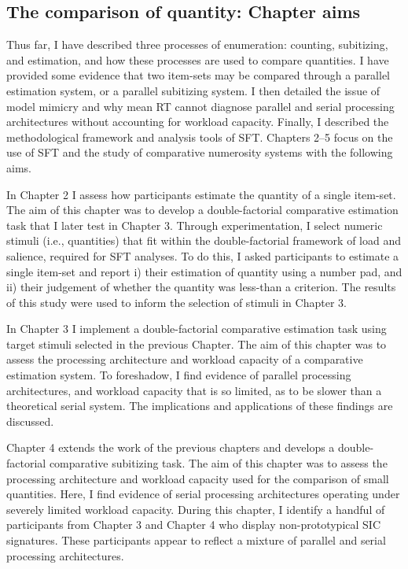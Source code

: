 \subsection{The comparison of quantity: Chapter aims}
Thus far, I have described three processes of enumeration: counting, subitizing, and estimation, and how these processes are used to compare quantities. I have provided some evidence that two item-sets may be compared through a parallel estimation system, or a parallel subitizing system. I then detailed the issue of model mimicry and why mean RT cannot diagnose parallel and serial processing architectures without accounting for workload capacity. Finally, I described the methodological framework and analysis tools of SFT. Chapters 2--5 focus on the use of SFT and the study of comparative numerosity systems with the following aims.

In Chapter 2 I assess how participants estimate the quantity of a single item-set. The aim of this chapter was to develop a double-factorial comparative estimation task that I later test in Chapter 3. Through experimentation, I select numeric stimuli (i.e., quantities) that fit within the double-factorial framework of load and salience, required for SFT analyses. To do this, I asked participants to estimate a single item-set and report i) their estimation of quantity using a number pad, and ii) their judgement of whether the quantity was less-than a criterion. The results of this study were used to inform the selection of stimuli in Chapter 3. 

In Chapter 3 I implement a double-factorial comparative estimation task using target stimuli selected in the previous Chapter. The aim of this chapter was to assess the processing architecture and workload capacity of a comparative estimation system. To foreshadow, I find evidence of parallel processing architectures, and workload capacity that is so limited, as to be slower than a theoretical serial system. The implications and applications of these findings are discussed.

Chapter 4 extends the work of the previous chapters and develops a double-factorial comparative subitizing task. The aim of this chapter was to assess the processing architecture and workload capacity used for the comparison of small quantities. Here, I find evidence of serial processing architectures operating under severely limited workload capacity. During this chapter, I identify a handful of participants from Chapter 3 and Chapter 4 who display non-prototypical SIC signatures. These participants appear to reflect a mixture of parallel and serial processing architectures.

